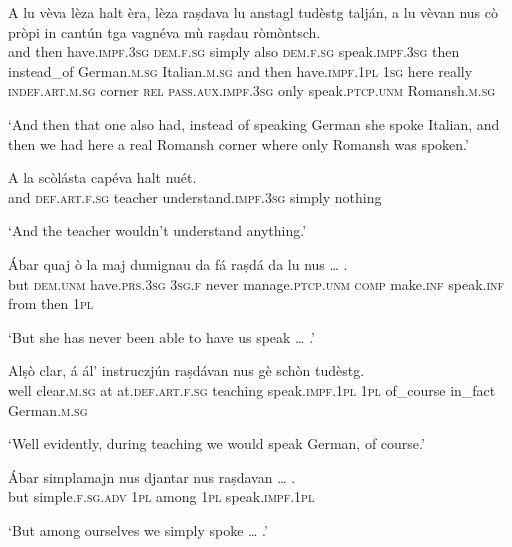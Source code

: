 \begin{linenumbers}
\gll A lu vèva lèza halt èra, lèza raṣdava lu anstagl tudèstg talján, a lu vèvan nus cò pròpi in cantún tga vagnéva mù raṣdau ròmòntsch.\\
and then have.\textsc{impf.3sg} \textsc{dem.f.sg} simply also \textsc{dem.f.sg} speak.\textsc{impf.3sg} then instead\_of German.\textsc{m.sg} Italian.\textsc{m.sg} and then have.\textsc{impf.1pl} \textsc{1sg} here really \textsc{indef.art.m.sg} corner \textsc{rel} \textsc{pass.aux.impf.3sg} only speak.\textsc{ptcp.unm} Romansh.\textsc{m.sg} \\
\end{linenumbers}
\medskip
\glt `And then that one also had, instead of speaking German she spoke Italian, and then we had here a real Romansh corner where only Romansh was spoken.'
\medskip

\begin{linenumbers}
\gll    A la scòlásta capéva halt nuét.\\
and \textsc{def.art.f.sg} teacher understand.\textsc{impf.3sg} simply nothing\\
\end{linenumbers}
\medskip
\glt `And the teacher wouldn’t understand anything.'
\medskip

\begin{linenumbers}
\gll    Ábar quaj ò la maj dumignau da fá raṣdá da lu nus … .\\
but \textsc{dem.unm} have.\textsc{prs.3sg} \textsc{3sg.f} never manage.\textsc{ptcp.unm} \textsc{comp} make.\textsc{inf} speak.\textsc{inf} from then \textsc{1pl}\\
\end{linenumbers}
\medskip
\glt `But she has never been able to have us speak … .'
\medskip

\begin{linenumbers}
\gll    Alṣò clar, á ál’ instruczjún raṣdávan nus gè schòn tudèstg.\\
well clear.\textsc{m.sg} at at.\textsc{def.art.f.sg} teaching speak.\textsc{impf.1pl} \textsc{1pl} of\_course in\_fact German.\textsc{m.sg}\\
\end{linenumbers}
\medskip
\glt `Well evidently, during teaching we would  speak German, of course.'
\medskip

\begin{linenumbers}
\gll    Ábar simplamajn nus djantar nus raṣdavan … .\\
but simple.\textsc{f.sg.adv} \textsc{1pl} among \textsc{1pl} speak.\textsc{impf.1pl}\\
\end{linenumbers}
\medskip
\glt `But among ourselves we simply spoke … .'
\medskip

